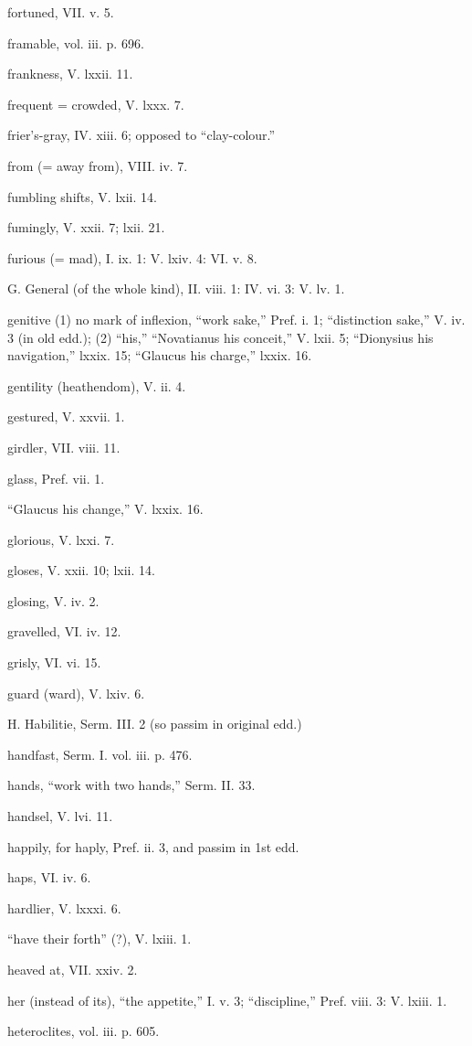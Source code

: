fortuned, VII. v. 5.

framable, vol. iii. p. 696.

frankness, V. lxxii. 11.

frequent = crowded, V. lxxx. 7.

frier’s-gray, IV. xiii. 6; opposed to “clay-colour.”

from (= away from), VIII. iv. 7.

fumbling shifts, V. lxii. 14.

fumingly, V. xxii. 7; lxii. 21.

furious (= mad), I. ix. 1: V. lxiv. 4: VI. v. 8.

G.
General (of the whole kind), II. viii. 1: IV. vi. 3: V. lv. 1.

genitive (1) no mark of inflexion, “work sake,” Pref. i. 1; “distinction sake,” V. iv. 3 (in old edd.); (2) “his,” “Novatianus his conceit,” V. lxii. 5; “Dionysius his navigation,” lxxix. 15; “Glaucus his charge,” lxxix. 16.

gentility (heathendom), V. ii. 4.

gestured, V. xxvii. 1.

girdler, VII. viii. 11.

glass, Pref. vii. 1.

“Glaucus his change,” V. lxxix. 16.

glorious, V. lxxi. 7.

gloses, V. xxii. 10; lxii. 14.

glosing, V. iv. 2.

gravelled, VI. iv. 12.

grisly, VI. vi. 15.

guard (ward), V. lxiv. 6.

H.
Habilitie, Serm. III. 2 (so passim in original edd.)

handfast, Serm. I. vol. iii. p. 476.

hands, “work with two hands,” Serm. II. 33.

handsel, V. lvi. 11.

happily, for haply, Pref. ii. 3, and passim in 1st edd.

haps, VI. iv. 6.

hardlier, V. lxxxi. 6.

“have their forth” (?), V. lxiii. 1.

heaved at, VII. xxiv. 2.

her (instead of its), “the appetite,” I. v. 3; “discipline,” Pref. viii. 3: V. lxiii. 1.

heteroclites, vol. iii. p. 605.

